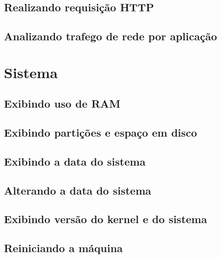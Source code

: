 \documentclass[a4paper,9pt]{extarticle}
\begin{document}
\begin{multicols}{2}
	
\subsection{Realizando requisição HTTP}
\subsection{Analizando trafego de rede por aplicação}

\section{Sistema}
\subsection{Exibindo uso de RAM}
	
	
\subsection{Exibindo partições e espaço em disco}
	

\subsection{Exibindo a data do sistema}
	
	
\subsection{Alterando a data do sistema}
	
	
\subsection{Exibindo versão do kernel e do sistema}
	
	
\subsection{Reiniciando a máquina}
	
	

\end{multicols}
\end{document}
